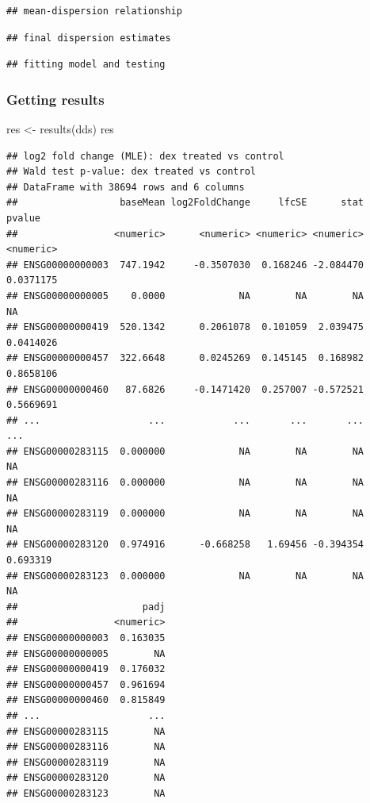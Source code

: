 \documentclass[
]{article}
\newenvironment{Shaded}{\begin{snugshade}}{\end{snugshade}}
\newcommand{\FunctionTok}[1]{\textcolor[rgb]{0.00,0.00,0.00}{#1}}
\newcommand{\NormalTok}[1]{#1}
\newcommand{\OtherTok}[1]{\textcolor[rgb]{0.56,0.35,0.01}{#1}}
\begin{document}
\begin{verbatim}
## mean-dispersion relationship
\end{verbatim}

\begin{verbatim}
## final dispersion estimates
\end{verbatim}

\begin{verbatim}
## fitting model and testing
\end{verbatim}

\hypertarget{getting-results}{%
\subsubsection{Getting results}\label{getting-results}}

\begin{Shaded}
\begin{Highlighting}[]
\NormalTok{res }\OtherTok{\textless{}{-}} \FunctionTok{results}\NormalTok{(dds)}
\NormalTok{res}
\end{Highlighting}
\end{Shaded}

\begin{verbatim}
## log2 fold change (MLE): dex treated vs control 
## Wald test p-value: dex treated vs control 
## DataFrame with 38694 rows and 6 columns
##                  baseMean log2FoldChange     lfcSE      stat    pvalue
##                 <numeric>      <numeric> <numeric> <numeric> <numeric>
## ENSG00000000003  747.1942     -0.3507030  0.168246 -2.084470 0.0371175
## ENSG00000000005    0.0000             NA        NA        NA        NA
## ENSG00000000419  520.1342      0.2061078  0.101059  2.039475 0.0414026
## ENSG00000000457  322.6648      0.0245269  0.145145  0.168982 0.8658106
## ENSG00000000460   87.6826     -0.1471420  0.257007 -0.572521 0.5669691
## ...                   ...            ...       ...       ...       ...
## ENSG00000283115  0.000000             NA        NA        NA        NA
## ENSG00000283116  0.000000             NA        NA        NA        NA
## ENSG00000283119  0.000000             NA        NA        NA        NA
## ENSG00000283120  0.974916      -0.668258   1.69456 -0.394354  0.693319
## ENSG00000283123  0.000000             NA        NA        NA        NA
##                      padj
##                 <numeric>
## ENSG00000000003  0.163035
## ENSG00000000005        NA
## ENSG00000000419  0.176032
## ENSG00000000457  0.961694
## ENSG00000000460  0.815849
## ...                   ...
## ENSG00000283115        NA
## ENSG00000283116        NA
## ENSG00000283119        NA
## ENSG00000283120        NA
## ENSG00000283123        NA
\end{verbatim}
\end{document}
